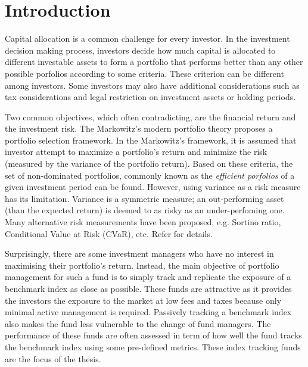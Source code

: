 \chapter{Introduction}
\graphicspath{{Chapter1/figures/}}
\label{Introduction}
Capital allocation is a common challenge for every investor. In the investment decision making process, investors decide how much capital is allocated to different investable assets to form a portfolio that performs better than any other possible porfolios according to some criteria. These criterion can be different among investors. Some investors may also have additional considerations such as tax considerations and legal restriction on investment assets or holding periods.

Two common objectives, which often contradicting, are the financial return and the investment risk. The Markowitz's modern portfolio theory \cite{HM52} proposes a portfolio selection framework. In the Markowitz's framework, it is assumed that investor attempt to maximize a portfolio's return and minimize the risk (measured by the variance of the portfolio return). Based on these criteria, the set of non-dominated portfolios, commonly known as the \emph{efficient porfolios} of a given investment period can be found. However, using variance as a risk measure has its limitation. Variance is a symmetric measure; an out-performing asset (than the expected return) is deemed to as risky as an under-perfoming one. Many alternative risk measurements have been proposed, e.g. Sortino ratio, Conditional Value at Risk (CVaR), etc. Refer \cite{RTR00} for details.


Surprisingly, there are some investment managers who have no interest in maximising their portfolio's return. Instead, the main objective of portfolio management for such a fund is to simply track and replicate the exposure of a benchmark index as close as possible. These funds are attractive as it provides the investors the exposure to the market at low fees and taxes because only minimal active management is required. Passively tracking a benchmark index also makes the fund less vulnerable to the change of fund managers. The performance of these funds are often assessed in term of how well the fund tracks the benchmark index using some pre-defined metrics. These index tracking funds are the focus of the thesis.


